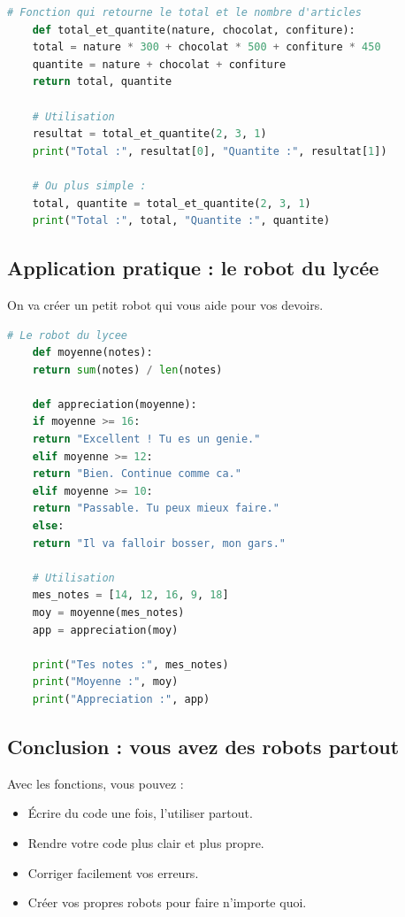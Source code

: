 \documentclass[12pt,a4paper]{article}
\begin{document}
\begin{lstlisting}[language=Python]
	# Fonction qui retourne le total et le nombre d'articles
	def total_et_quantite(nature, chocolat, confiture):
	total = nature * 300 + chocolat * 500 + confiture * 450
	quantite = nature + chocolat + confiture
	return total, quantite
	
	# Utilisation
	resultat = total_et_quantite(2, 3, 1)
	print("Total :", resultat[0], "Quantite :", resultat[1])
	
	# Ou plus simple :
	total, quantite = total_et_quantite(2, 3, 1)
	print("Total :", total, "Quantite :", quantite)
\end{lstlisting}

\subsection{Application pratique : le robot du lycée}

On va créer un petit robot qui vous aide pour vos devoirs.

\begin{lstlisting}[language=Python]
	# Le robot du lycee
	def moyenne(notes):
	return sum(notes) / len(notes)
	
	def appreciation(moyenne):
	if moyenne >= 16:
	return "Excellent ! Tu es un genie."
	elif moyenne >= 12:
	return "Bien. Continue comme ca."
	elif moyenne >= 10:
	return "Passable. Tu peux mieux faire."
	else:
	return "Il va falloir bosser, mon gars."
	
	# Utilisation
	mes_notes = [14, 12, 16, 9, 18]
	moy = moyenne(mes_notes)
	app = appreciation(moy)
	
	print("Tes notes :", mes_notes)
	print("Moyenne :", moy)
	print("Appreciation :", app)
\end{lstlisting}

\subsection{Conclusion : vous avez des robots partout}

Avec les fonctions, vous pouvez :

\begin{itemize}
	\item [\ding{172}] Écrire du code une fois, l'utiliser partout.
	\item [\ding{173}] Rendre votre code plus clair et plus propre.
	\item [\ding{174}] Corriger facilement vos erreurs.
	\item [\ding{175}] Créer vos propres robots pour faire n'importe quoi.
\end{itemize}
\end{document}
